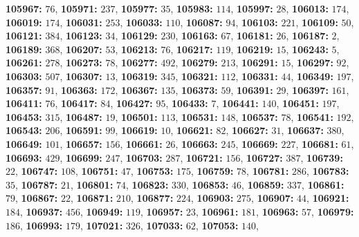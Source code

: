 \textsf{\bfseries 105967:} $76$, \textsf{\bfseries 105971:} $237$, \textsf{\bfseries 105977:} $35$, \textsf{\bfseries 105983:} $114$, \textsf{\bfseries 105997:} $28$, \textsf{\bfseries 106013:} $174$, \textsf{\bfseries 106019:} $174$, \textsf{\bfseries 106031:} $253$, \textsf{\bfseries 106033:} $110$, \textsf{\bfseries 106087:} $94$, \textsf{\bfseries 106103:} $221$, \textsf{\bfseries 106109:} $50$, \textsf{\bfseries 106121:} $384$, \textsf{\bfseries 106123:} $34$, \textsf{\bfseries 106129:} $230$, \textsf{\bfseries 106163:} $67$, \textsf{\bfseries 106181:} $26$, \textsf{\bfseries 106187:} $2$, \textsf{\bfseries 106189:} $368$, \textsf{\bfseries 106207:} $53$, \textsf{\bfseries 106213:} $76$, \textsf{\bfseries 106217:} $119$, \textsf{\bfseries 106219:} $15$, \textsf{\bfseries 106243:} $5$, \textsf{\bfseries 106261:} $278$, \textsf{\bfseries 106273:} $78$, \textsf{\bfseries 106277:} $492$, \textsf{\bfseries 106279:} $213$, \textsf{\bfseries 106291:} $15$, \textsf{\bfseries 106297:} $92$, \textsf{\bfseries 106303:} $507$, \textsf{\bfseries 106307:} $13$, \textsf{\bfseries 106319:} $345$, \textsf{\bfseries 106321:} $112$, \textsf{\bfseries 106331:} $44$, \textsf{\bfseries 106349:} $197$, \textsf{\bfseries 106357:} $91$, \textsf{\bfseries 106363:} $172$, \textsf{\bfseries 106367:} $135$, \textsf{\bfseries 106373:} $59$, \textsf{\bfseries 106391:} $29$, \textsf{\bfseries 106397:} $161$, \textsf{\bfseries 106411:} $76$, \textsf{\bfseries 106417:} $84$, \textsf{\bfseries 106427:} $95$, \textsf{\bfseries 106433:} $7$, \textsf{\bfseries 106441:} $140$, \textsf{\bfseries 106451:} $197$, \textsf{\bfseries 106453:} $315$, \textsf{\bfseries 106487:} $19$, \textsf{\bfseries 106501:} $113$, \textsf{\bfseries 106531:} $148$, \textsf{\bfseries 106537:} $78$, \textsf{\bfseries 106541:} $192$, \textsf{\bfseries 106543:} $206$, \textsf{\bfseries 106591:} $99$, \textsf{\bfseries 106619:} $10$, \textsf{\bfseries 106621:} $82$, \textsf{\bfseries 106627:} $31$, \textsf{\bfseries 106637:} $380$, \textsf{\bfseries 106649:} $101$, \textsf{\bfseries 106657:} $156$, \textsf{\bfseries 106661:} $26$, \textsf{\bfseries 106663:} $245$, \textsf{\bfseries 106669:} $227$, \textsf{\bfseries 106681:} $61$, \textsf{\bfseries 106693:} $429$, \textsf{\bfseries 106699:} $247$, \textsf{\bfseries 106703:} $287$, \textsf{\bfseries 106721:} $156$, \textsf{\bfseries 106727:} $387$, \textsf{\bfseries 106739:} $22$, \textsf{\bfseries 106747:} $108$, \textsf{\bfseries 106751:} $47$, \textsf{\bfseries 106753:} $175$, \textsf{\bfseries 106759:} $78$, \textsf{\bfseries 106781:} $286$, \textsf{\bfseries 106783:} $35$, \textsf{\bfseries 106787:} $21$, \textsf{\bfseries 106801:} $74$, \textsf{\bfseries 106823:} $330$, \textsf{\bfseries 106853:} $46$, \textsf{\bfseries 106859:} $337$, \textsf{\bfseries 106861:} $79$, \textsf{\bfseries 106867:} $22$, \textsf{\bfseries 106871:} $210$, \textsf{\bfseries 106877:} $224$, \textsf{\bfseries 106903:} $275$, \textsf{\bfseries 106907:} $44$, \textsf{\bfseries 106921:} $184$, \textsf{\bfseries 106937:} $456$, \textsf{\bfseries 106949:} $119$, \textsf{\bfseries 106957:} $23$, \textsf{\bfseries 106961:} $181$, \textsf{\bfseries 106963:} $57$, \textsf{\bfseries 106979:} $186$, \textsf{\bfseries 106993:} $179$, \textsf{\bfseries 107021:} $326$, \textsf{\bfseries 107033:} $62$, \textsf{\bfseries 107053:} $140$, 
